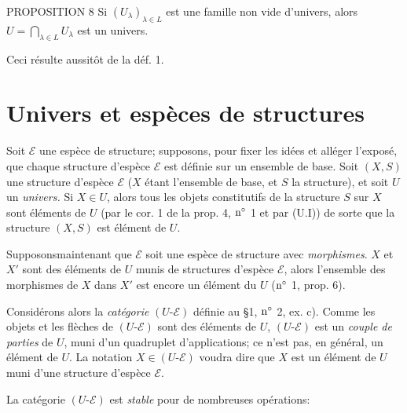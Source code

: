 \begin{enonce*}{PROPOSITION 8}
Si $(U_{\lambda})_{\lambda\in L}$ est une famille non vide
d'univers, alors $U=\bigcap_{\lambda\in L}U_{\lambda}$ est un
univers.
\end{enonce*}
Ceci résulte aussitôt de la déf. 1.

\section{Univers et espèces de structures}

Soit $\mathcal{E}$ une espèce de structure; supposons, pour fixer
les idées et alléger l'exposé, que chaque structure d'espèce
$\mathcal{E}$ est définie sur un ensemble de base. Soit $(X,S)$ une
structure d'espèce $\mathcal{E}$ ($X$ étant l'ensemble de base, et
$S$ la structure), et soit $U$ un \emph{univers.} Si $X\in U$, alors
tous les objets constitutifs de la structure $S$ sur $X$ sont
éléments de $U$ (par le cor. 1 de la prop. 4, ${\rm n^{\circ}}$ 1 et
par (U.I)) de sorte que la structure $(X,S)$ est élément de $U$.

Supposons\pageoriginale maintenant que $\mathcal{E}$ soit une espèce
de structure avec \emph{morphismes}. $X$ et $X'$ sont des éléments
de $U$ munis de structures d'espèce $\mathcal{E}$, alors l'ensemble
des morphismes de $X$ dans $X'$ est encore un élément du $U$ (${\rm
n^{\circ}}$ 1, prop. 6).

Considérons alors la \emph{catégorie} $(U\text{-}\mathcal{E})$
définie au \S 1, ${\rm n^{\circ}}$ 2, ex. c). Comme les objets et
les flèches de $(U\text{-}\mathcal{E})$ sont des éléments de $U$,
$(U\text{-}\mathcal{E})$ est un \emph{couple de parties} de $U$,
muni d'un quadruplet d'applications; ce n'est pas, en général, un
élément de $U$. La notation $X\in (U\text{-}\mathcal{E})$ voudra
dire que $X$ est un élément de $U$ muni d'une structure d'espèce
$\mathcal{E}$.

La catégorie $(U\text{-}\mathcal{E})$ est \emph{stable} pour de
nombreuses opérations:

